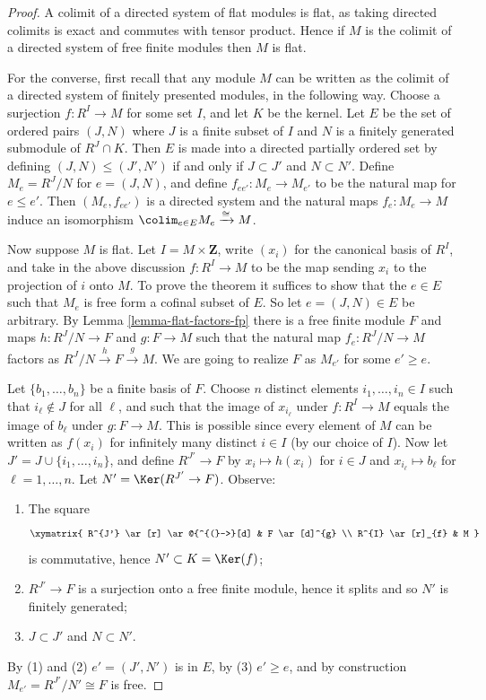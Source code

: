 \begin{proof}
A colimit of a directed system of flat modules is flat, as taking directed
colimits is exact and commutes with tensor product. Hence if $M$ is the colimit
of a directed system of free finite modules then $M$ is flat.

\medskip\noindent
For the converse, first recall that any module $M$ can be written as the
colimit of a directed system of finitely presented modules, in the following
way.  Choose a surjection $f: R^I \to M$ for some set $I$, and let $K$
be the kernel.  Let $E$ be the set of ordered pairs $(J, N)$ where $J$ is a
finite subset of $I$ and $N$ is a finitely generated submodule of $R^J \cap K$.
Then $E$ is made into a directed partially ordered set by defining $(J, N) \leq
(J', N')$ if and only if $J \subset J'$ and $N \subset N'$.  Define $M_e =
R^J/N$ for $e = (J, N)$, and define $f_{ee'}: M_e \to M_{e'}$ to be
the natural map for $e \leq e'$.  Then $(M_e, f_{ee'})$ is a directed system and
the natural maps $f_e: M_e \to M$ induce an isomorphism
$\colim_{e
\in E} M_e \xrightarrow{\cong} M$.

\medskip\noindent
Now suppose $M$ is flat.  Let $I = M \times \mathbf{Z}$, write $(x_i)$ for
the canonical basis of $R^{I}$, and take in the above discussion $f: R^I
\to M$ to be the map sending $x_i$ to the projection of $i$ onto $M$.
To prove the theorem it suffices to show that the $e \in E$ such that $M_e$
is free form a cofinal subset of $E$.  So let $e = (J, N) \in E$ be arbitrary.
By Lemma \ref{lemma-flat-factors-fp} there is a free finite module $F$ and maps
$h: R^J/N \to F$ and $g: F \to M$ such that the natural map
$f_e: R^J/N \to M$ factors as $R^J/N \xrightarrow{h} F
\xrightarrow{g} M$.  We are going to realize $F$ as $M_{e'}$ for some $e' \geq
e$.

\medskip\noindent
Let $\{ b_1, \ldots, b_n \}$ be a finite basis of $F$.  Choose $n$ distinct
elements $i_1, \ldots, i_n \in I$ such that $i_{\ell} \notin J$ for all $\ell$,
and such that the image of $x_{i_{\ell}}$ under $f: R^I \to M$ equals
the image of $b_{\ell}$ under $g: F \to M$.  This is possible since
every element of $M$ can be written as $f(x_i)$ for infinitely many
distinct $i \in I$ (by our choice of $I$).  Now let
$J' = J \cup \{i_1, \ldots , i_n \}$, and define $R^{J'}
\to F$ by $x_i \mapsto h(x_i)$ for $i \in J$ and $x_{i_{\ell}} \mapsto
b_{\ell}$ for $\ell = 1, \ldots, n$.  Let $N' = \Ker(R^{J'} \to F)$.
Observe:
\begin{enumerate}
\item The square
$$
\xymatrix{
R^{J'} \ar[r] \ar@{^{(}->}[d] & F \ar[d]^{g} \\
R^{I} \ar[r]_{f} & M
}
$$
is commutative,
hence $N' \subset K = \Ker(f)$;
\item $R^{J'} \to F$ is a surjection onto a free finite module, hence
it splits and so $N'$ is finitely generated;
\item $J \subset J'$ and $N \subset N'$.
\end{enumerate}
By (1) and (2) $e' = (J', N')$ is in $E$, by (3) $e' \geq e$, and by
construction $M_{e'} = R^{J'}/N' \cong F$ is free.
\end{proof}

